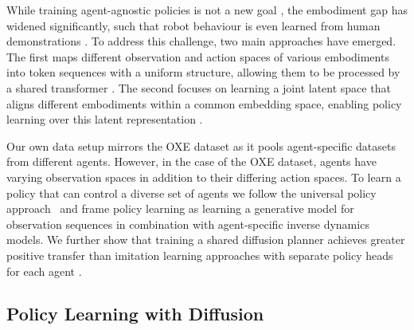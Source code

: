 While training agent-agnostic policies is not a new goal \cite{agent_agnostic_policy}, the embodiment gap has widened significantly, such that robot behaviour is even learned from human demonstrations \cite{xskill,learning_human_data1}. To address this challenge, two main approaches have emerged. The first maps different observation and action spaces of various embodiments into token sequences with a uniform structure, allowing them to be processed by a shared transformer \cite{octo_policy,cross_former}. The second focuses on learning a joint latent space that aligns different embodiments within a common embedding space, enabling policy learning over this latent representation \cite{xskill,latent_space_alignment}.

Our own data setup mirrors the OXE dataset as it pools agent-specific datasets from different agents. However, in the case of the OXE dataset, agents have varying observation spaces in addition to their differing action spaces. To learn a policy that can control a diverse set of agents we follow the universal policy approach~\cite{universal_policies} and frame policy learning as learning a generative model for observation sequences in combination with agent-specific inverse dynamics models. We further show that training a shared diffusion planner achieves greater positive transfer than imitation learning approaches with separate policy heads for each agent \cite{octo_policy,cross_former}.








\subsection{Policy Learning with Diffusion}

